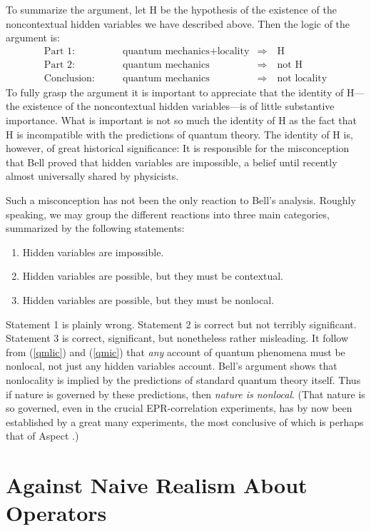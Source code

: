 \documentclass[12pt]{article}
\begin{document}
To summarize the argument, let H be the hypothesis of the existence of
the noncontextual hidden variables we have described above.  Then the
logic of the argument is:
\begin{eqnarray}
\text{Part 1:}&\qquad \mbox{quantum mechanics} + \mbox{locality}
&\Rightarrow\quad
\mbox{H} \label{qmlic}\\
\text{Part 2:}&\qquad \mbox{quantum mechanics} &\Rightarrow\quad
\mbox{not H} \label{qmic}\\
\text{Conclusion:}&\qquad \mbox{quantum mechanics} &\Rightarrow\quad
\mbox{not locality} \label{qmiccon}
\end{eqnarray}
To fully grasp the argument it is important to appreciate that the
identity of H---the existence of the noncontextual hidden
variables---is of little substantive importance. What is important is
not so much the identity of H as the fact that H is incompatible with
the predictions of quantum theory.  The identity of H is, however, of
great historical significance: It is responsible for the misconception
that Bell proved that hidden variables are impossible, a belief until
recently almost universally shared by physicists.

Such a misconception has not been the only reaction to Bell's
analysis.  Roughly speaking, we may group the different reactions into
three main categories, summarized by the following statements:
\begin{enumerate}
\item Hidden variables are impossible.
\item Hidden variables are possible, but they must be contextual.
\item Hidden variables are possible, but they must be nonlocal.
\end{enumerate}
Statement 1 is plainly wrong.  Statement 2 is correct but not terribly
significant.  Statement 3 is correct, significant, but nonetheless
rather misleading. It follow {}from (\ref{qmlic}) and (\ref{qmic})
that {\em any} account of quantum phenomena must be nonlocal, not just
any hidden variables account. Bell's argument shows that nonlocality
is implied by the predictions of standard quantum theory itself. Thus
if nature is governed by these predictions, then {\em nature is
   nonlocal}. (That nature is so governed, even in the crucial
EPR-correlation experiments, has by now been established by a great
many experiments, the most conclusive of which is perhaps that of
Aspect \cite{Aspect1982}.)

\section{Against Naive Realism About Operators}
\end{document}
